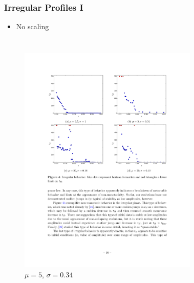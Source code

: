 \documentclass[mathserif,10pt]{beamer}
\newcommand{\bi}{\begin{itemize}}
\newcommand{\ei}{\end{itemize}}
\newcommand{\its}{\item}
\begin{document}
{\frame
{
  \frametitle{Irregular Profiles I}
  \bi
  \its No scaling
  \ei
  \begin{columns}
  	\begin{figure}
  	\centering
  	\includegraphics[width=\textwidth]{m5w034} \\ $\mu = 5$, $\sigma = 0.34$
  	\end{figure}
  	\begin{figure}
	\centering

\end{figure}
\end{columns}}}
\end{document}
